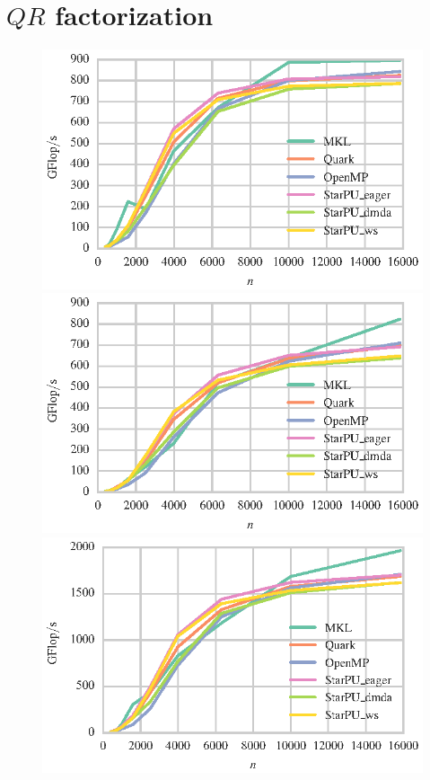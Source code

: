 \documentclass[a4paper,12pt]{article}
\begin{document}
\section{$QR$ factorization}
\label{sec.qr}
\begin{figure}[t]
  \centering
  \includegraphics[scale=.85]{fig/kebnekaise_zgeqrf_weak_scaling.eps}
  \includegraphics[scale=.85]{fig/kebnekaise_dgeqrf_weak_scaling.eps}
  \includegraphics[scale=.85]{fig/kebnekaise_cgeqrf_weak_scaling.eps}

\end{figure}
\end{document}

